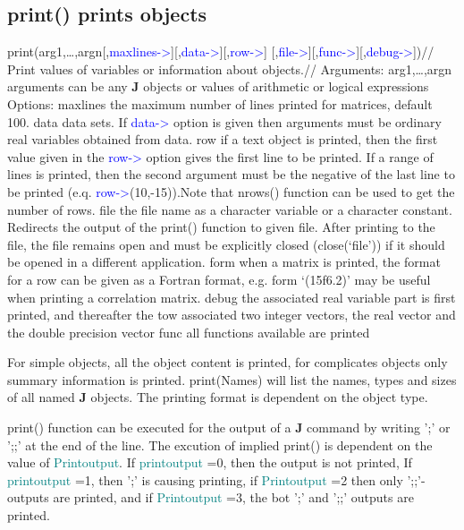 \subsection{\textcolor{VioletRed}{print}() prints objects}
\label{print}
\textcolor{VioletRed}{print}(arg1,…,argn[,\textcolor{blue}{maxlines->}][,\textcolor{blue}{data->}][,\textcolor{blue}{row->}]
[,\textcolor{blue}{file->}][,\textcolor{blue}{func->}][,\textcolor{blue}{debug->}])//
Print values of variables or information about objects.//
Arguments:
arg1,…,argn
arguments can be any \textbf{J} objects or values of arithmetic or logical expressions
Options:
maxlines the maximum number of lines printed for matrices, default 100.
data data sets. If \textcolor{blue}{data->} option is given then arguments must be ordinary real
variables obtained from data.
row if a text object is printed, then the first value given in the \textcolor{blue}{row->} option gives the
first line to be printed. If a range of lines is printed, then the second argument
must be the negative of the last line to be printed (e.q. \textcolor{blue}{row->}(10,-15)).Note
that \textcolor{VioletRed}{nrows}() function can be used to get the number of rows.
file the file name as a character variable or a character constant. Redirects the output
of the \textcolor{VioletRed}{print}() function to given file. After printing to the file, the file remains
open and must be explicitly closed (\textcolor{VioletRed}{close}(‘file’)) if it should be opened in
a different application.
form when a matrix is printed, the format for a row can be given as a Fortran format,
e.g. form ‘(15f6.2)’ may be useful when printing a correlation matrix.
debug the associated real variable part is first printed, and thereafter the tow associated
two integer vectors, the real vector and the double precision vector
func all functions available are printed
\begin{note}
For simple objects, all the object content is printed, for complicates objects only
summary information is printed. \textcolor{VioletRed}{print}(Names) will list the names, types and sizes of all
named \textbf{J} objects. The printing format is dependent on the object type.
\end{note}
\begin{note}
\textcolor{VioletRed}{print}() function can be executed for the output of a \textbf{J} command
by writing ';' or ';;' at the end of the line. The excution of implied \textcolor{VioletRed}{print}()
is dependent on the value of \textcolor{teal}{Printoutput}. If \textcolor{teal}{printoutput} =0,
then the output is not printed, If \textcolor{teal}{printoutput} =1, then ';' is
causing printing, if \textcolor{teal}{Printoutput} =2 then only ';;'-outputs are
printed, and if \textcolor{teal}{Printoutput} =3, the bot ';' and ';;' outputs are printed.
\end{note}


